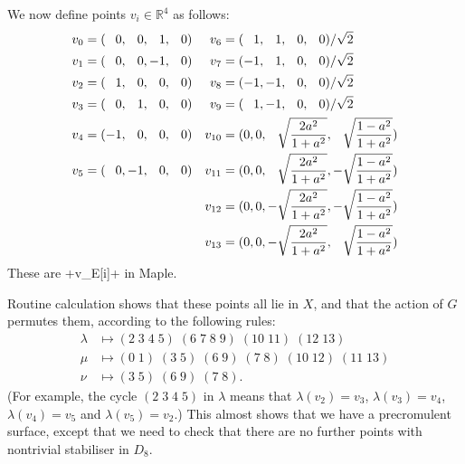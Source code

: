 \documentclass[reqno]{amsart}
\newcommand{\lm}        {\lambda}
\newcommand{\R}         {{\mathbb{R}}}
\newcommand{\rt}        {\sqrt{2}}
\newcommand{\pp}        {\hphantom{+}}
\renewcommand{\:}{\colon}
\theoremstyle{definition}
\begin{document}
We now define points $v_i\in\R^4$ as follows:
\begin{align*}
 v_{ 0} &= (\pp 0,\pp 0,\pp 1,\pp 0) &
 v_{ 6} &= (\pp 1,\pp 1,\pp 0,\pp 0)/\rt \\
 v_{ 1} &= (\pp 0,\pp 0,   -1,\pp 0) &
 v_{ 7} &= (   -1,\pp 1,\pp 0,\pp 0)/\rt \\
 v_{ 2} &= (\pp 1,\pp 0,\pp 0,\pp 0) &
 v_{ 8} &= (   -1,   -1,\pp 0,\pp 0)/\rt \\
 v_{ 3} &= (\pp 0,\pp 1,\pp 0,\pp 0) &
 v_{ 9} &= (\pp 1,   -1,\pp 0,\pp 0)/\rt \\
 v_{ 4} &= (   -1,\pp 0,\pp 0,\pp 0) &
 v_{10} &= (0,0,\pp\sqrt{\frac{2a^2}{1+a^2}},\pp\sqrt{\frac{1-a^2}{1+a^2}}) \\
 v_{ 5} &= (\pp 0,-1,\pp 0,\pp 0) &
 v_{11} &= (0,0,\pp\sqrt{\frac{2a^2}{1+a^2}},  -\sqrt{\frac{1-a^2}{1+a^2}}) \\
 &&
 v_{12} &= (0,0,  -\sqrt{\frac{2a^2}{1+a^2}},  -\sqrt{\frac{1-a^2}{1+a^2}}) \\
 &&
 v_{13} &= (0,0,  -\sqrt{\frac{2a^2}{1+a^2}},\pp\sqrt{\frac{1-a^2}{1+a^2}})
\end{align*}
These are \mcode+v_E[i]+ in Maple.

Routine calculation shows that these points all lie in $X$, and that
the action of $G$ permutes them, according to the following rules:
\begin{align*}
 \lm &\mapsto (2\;3\;4\;5)\;(6\;7\;8\;9)\;(10\;11)\;(12\;13) \\
 \mu &\mapsto (0\;1)\;(3\;5)\;(6\;9)\;(7\;8)\;(10\;12)\;(11\;13) \\
 \nu &\mapsto (3\;5)\;(6\;9)\;(7\;8).
\end{align*}
(For example, the cycle $(2\;3\;4\;5)$ in $\lm$ means that
$\lm(v_2)=v_3$, $\lm(v_3)=v_4$, $\lm(v_4)=v_5$ and $\lm(v_5)=v_2$.)
This almost shows that we have a precromulent surface, except that we
need to check that there are no further points with nontrivial
stabiliser in $D_8$.
\end{document}
